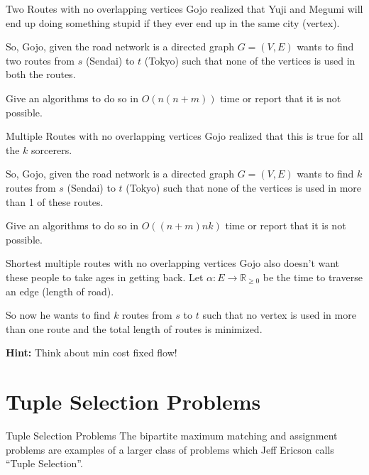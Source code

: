 \documentclass[aspectratio=169,11pt]{beamer}
\newcommand{\blankslides}{%
  \begin{frame}[plain]\end{frame}%
  \begin{frame}[plain]\end{frame}%
}
\begin{document}
\begin{frame}{Two Routes with no overlapping vertices}
Gojo realized that Yuji and Megumi will end up doing something stupid if they ever end up in the same
city (vertex).

\medskip
So, Gojo, given the road network is a directed graph $G=(V,E)$ wants to find two routes from $s$ (Sendai)
to $t$ (Tokyo) such that none of the vertices is used in both the routes.

\medskip
Give an algorithms to do so in $O(n(n+m))$ time or report that it is not possible.
\end{frame}
\blankslides

\begin{frame}{Multiple Routes with no overlapping vertices}
Gojo realized that this is true for all the $k$ sorcerers.

\medskip
So, Gojo, given the road network is a directed graph $G=(V,E)$ wants to find $k$ routes from $s$ (Sendai)
to $t$ (Tokyo) such that none of the vertices is used in more than 1 of these routes.

\medskip
Give an algorithms to do so in $O((n+m)nk)$ time or report that it is not possible.
\end{frame}
\blankslides

\begin{frame}{Shortest multiple routes with no overlapping vertices}
Gojo also doesn't want these people to take ages in getting back. Let $\alpha:E\to\mathbb{R}_{\ge0}$ be
the time to traverse an edge (length of road).

\medskip
So now he wants to find $k$ routes from $s$ to $t$ such that no vertex is used in more than one route and
the total length of routes is minimized.

\medskip
\textbf{Hint:} Think about min cost fixed flow!
\end{frame}
\blankslides

\section{Tuple Selection Problems}

\begin{frame}{Tuple Selection Problems}
The bipartite maximum matching and assignment problems are examples of a larger class of problems which
Jeff Ericson calls ``Tuple Selection''.
\end{frame}
\end{document}
